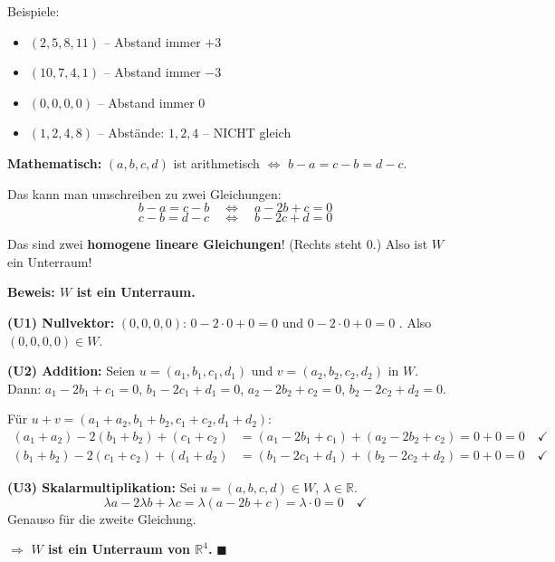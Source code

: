 \documentclass[a4paper,12pt]{article}
\begin{document}
Beispiele:
\begin{itemize}
    \item $(2, 5, 8, 11)$ -- Abstand immer $+3$ \checkmark
    \item $(10, 7, 4, 1)$ -- Abstand immer $-3$ \checkmark
    \item $(0, 0, 0, 0)$ -- Abstand immer $0$ \checkmark
    \item $(1, 2, 4, 8)$ -- Abst\"ande: $1, 2, 4$ -- NICHT gleich \Lightning
\end{itemize}

\textbf{Mathematisch:} $(a, b, c, d)$ ist arithmetisch $\Leftrightarrow$ $b - a = c - b = d - c$.

Das kann man umschreiben zu zwei Gleichungen:
\[
b - a = c - b \quad \Leftrightarrow \quad a - 2b + c = 0
\]
\[
c - b = d - c \quad \Leftrightarrow \quad b - 2c + d = 0
\]

\begin{merkbox}
Das sind zwei \textbf{homogene lineare Gleichungen}! (Rechts steht $0$.) Also ist $W$ ein Unterraum!
\end{merkbox}

\textbf{Beweis: $W$ ist ein Unterraum.}

\textbf{(U1) Nullvektor:} $(0, 0, 0, 0)$: $0 - 2 \cdot 0 + 0 = 0$ \checkmark{} und $0 - 2 \cdot 0 + 0 = 0$ \checkmark. Also $(0,0,0,0) \in W$.

\textbf{(U2) Addition:} Seien $u = (a_1, b_1, c_1, d_1)$ und $v = (a_2, b_2, c_2, d_2)$ in $W$.\\
Dann: $a_1 - 2b_1 + c_1 = 0$, $b_1 - 2c_1 + d_1 = 0$, $a_2 - 2b_2 + c_2 = 0$, $b_2 - 2c_2 + d_2 = 0$.

F\"ur $u + v = (a_1+a_2, b_1+b_2, c_1+c_2, d_1+d_2)$:
\begin{align*}
(a_1+a_2) - 2(b_1+b_2) + (c_1+c_2) &= (a_1 - 2b_1 + c_1) + (a_2 - 2b_2 + c_2) = 0 + 0 = 0 \quad \checkmark \\
(b_1+b_2) - 2(c_1+c_2) + (d_1+d_2) &= (b_1 - 2c_1 + d_1) + (b_2 - 2c_2 + d_2) = 0 + 0 = 0 \quad \checkmark
\end{align*}

\textbf{(U3) Skalarmultiplikation:} Sei $u = (a, b, c, d) \in W$, $\lambda \in \mathbb{R}$.
\[
\lambda a - 2\lambda b + \lambda c = \lambda(a - 2b + c) = \lambda \cdot 0 = 0 \quad \checkmark
\]
Genauso f\"ur die zweite Gleichung.

$\Rightarrow$ \textbf{$W$ ist ein Unterraum von $\mathbb{R}^4$.} \hfill $\blacksquare$

\newpage
\end{document}
